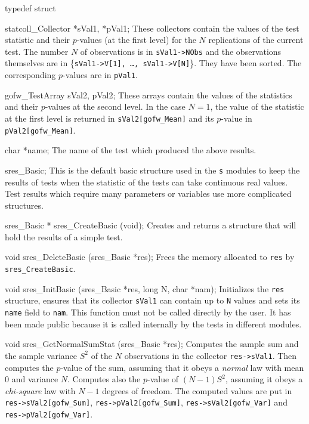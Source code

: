 typedef struct {

   statcoll_Collector *sVal1, *pVal1;
\endcode
 \tabb
  These collectors contain the values of the test statistic and their
  $p$-values  (at the first level) for the $N$ replications of the current
  test. The number $N$ of observations is in {\tt sVal1->NObs} and the
  observations themselves are in \{{\tt sVal1->V[1], \ldots,
  sVal1->V[N]}\}. They have been sorted.
  The corresponding $p$-values are in {\tt pVal1}.
 \endtabb
\code

   gofw_TestArray sVal2, pVal2;
\endcode
 \tabb
  These arrays contain the values of the statistics and their $p$-values
  at the second level. In the case $N=1$, the value of the  statistic at
  the first level is returned in {\tt sVal2[gofw\_Mean]} and its $p$-value
  in {\tt pVal2[gofw\_Mean]}.
 \endtabb
\code

   char *name;
\endcode
 \tabb
  The name of the test which produced the above results.
 \endtabb
\code

} sres_Basic;
\endcode
 \tab
  This is the default basic structure used in the {\tt s} modules
  to keep the results of tests when the statistic of the tests can take
  continuous real values. Test results which require many parameters or
  variables use more complicated structures.
 \endtab
\code


sres_Basic * sres_CreateBasic (void);
\endcode
 \tab
  Creates and returns a structure that will hold the results
  of a simple test.
 \endtab
\code


void sres_DeleteBasic (sres_Basic *res);
\endcode
 \tab
  Frees the memory allocated to {\tt res} by {\tt sres\_CreateBasic}.
 \endtab
\code


void sres_InitBasic (sres_Basic *res, long N, char *nam);
\endcode
 \tab
   Initializes the {\tt res} structure, ensures that its
   collector {\tt sVal1}  can contain up to  {\tt N} values and sets
   its  {\tt name} field to  {\tt nam}. This function must not be called
   directly by the user. It has been made public because it is called
   internally by the tests in different modules.
 \endtab
\code


void sres_GetNormalSumStat (sres_Basic *res);
\endcode
 \tab
  Computes the sample sum and the sample variance $S^2$ of the $N$ observations in
  the collector {\tt res->sVal1}. Then computes the $p$-value of the sum, assuming
  that it obeys a {\em normal\/} law with mean 0 and variance $N$. Computes also
  the $p$-value of $(N-1)S^2$, assuming it obeys a {\em chi-square\/} law with
  $N-1$ degrees of freedom. The computed values are put in
  {\tt res->sVal2[gofw\_Sum]}, {\tt res->pVal2[gofw\_Sum]},
  {\tt res->sVal2[gofw\_Var]} and {\tt res->pVal2[gofw\_Var]}.
 \endtab



